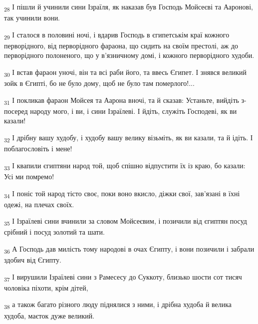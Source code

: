 \begin{tcolorbox}
\textsubscript{28} І пішли й учинили сини Ізраїля, як наказав був Господь Мойсеєві та Ааронові, так учинили вони.
\end{tcolorbox}
\begin{tcolorbox}
\textsubscript{29} І сталося в половині ночі, і вдарив Господь в єгипетськім краї кожного перворідного, від перворідного фараона, що сидить на своїм престолі, аж до перворідного полоненого, що у в'язничному домі, і кожного перворідного худоби.
\end{tcolorbox}
\begin{tcolorbox}
\textsubscript{30} І встав фараон уночі, він та всі раби його, та ввесь Єгипет. І знявся великий зойк в Єгипті, бо не було дому, щоб не було там померлого!...
\end{tcolorbox}
\begin{tcolorbox}
\textsubscript{31} І покликав фараон Мойсея та Аарона вночі, та й сказав: Устаньте, вийдіть з-посеред народу мого, і ви, і сини Ізраїлеві. І йдіть, служіть Господеві, як ви казали!
\end{tcolorbox}
\begin{tcolorbox}
\textsubscript{32} І дрібну вашу худобу, і худобу вашу велику візьміть, як ви казали, та й ідіть. І поблагословіть і мене!
\end{tcolorbox}
\begin{tcolorbox}
\textsubscript{33} І квапили єгиптяни народ той, щоб спішно відпустити їх із краю, бо казали: Усі ми помремо!
\end{tcolorbox}
\begin{tcolorbox}
\textsubscript{34} І поніс той народ тісто своє, поки воно вкисло, діжки свої, зав'язані в їхні одежі, на плечах своїх.
\end{tcolorbox}
\begin{tcolorbox}
\textsubscript{35} І Ізраїлеві сини вчинили за словом Мойсеєвим, і позичили від єгиптян посуд срібний і посуд золотий та шати.
\end{tcolorbox}
\begin{tcolorbox}
\textsubscript{36} А Господь дав милість тому народові в очах Єгипту, і вони позичили і забрали здобич від Єгипту.
\end{tcolorbox}
\begin{tcolorbox}
\textsubscript{37} І вирушили Ізраїлеві сини з Рамесесу до Суккоту, близько шости сот тисяч чоловіка піхоти, крім дітей,
\end{tcolorbox}
\begin{tcolorbox}
\textsubscript{38} а також багато різного люду піднялися з ними, і дрібна худоба й велика худоба, маєток дуже великий.
\end{tcolorbox}
